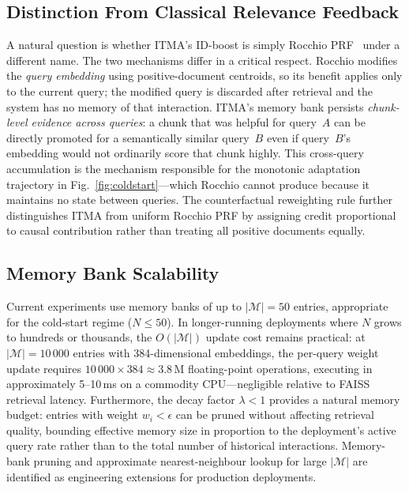 \documentclass[journal]{IEEEtran}
\begin{document}
\subsection{Distinction From Classical Relevance Feedback}
A natural question is whether ITMA's ID-boost is simply Rocchio
PRF~\cite{rocchio1971relevance} under a different name.  The two
mechanisms differ in a critical respect.  Rocchio modifies the
\emph{query embedding} using positive-document centroids, so its
benefit applies only to the current query; the modified query is
discarded after retrieval and the system has no memory of that
interaction.  ITMA's memory bank persists \emph{chunk-level evidence
across queries}: a chunk that was helpful for query~$A$ can be
directly promoted for a semantically similar query~$B$ even if
query~$B$'s embedding would not ordinarily score that chunk highly.
This cross-query accumulation is the mechanism responsible for the
monotonic adaptation trajectory in Fig.~\ref{fig:coldstart}---which
Rocchio cannot produce because it maintains no state between queries.
The counterfactual reweighting rule further distinguishes ITMA from
uniform Rocchio PRF by assigning credit proportional to causal
contribution rather than treating all positive documents equally.

\subsection{Memory Bank Scalability}
Current experiments use memory banks of up to $|\mathcal{M}|{=}50$
entries, appropriate for the cold-start regime ($N\leq 50$).  In
longer-running deployments where $N$ grows to hundreds or thousands,
the $O(|\mathcal{M}|)$ update cost remains practical: at
$|\mathcal{M}|{=}10\,000$ entries with 384-dimensional embeddings, the
per-query weight update requires $10\,000 \times 384 \approx 3.8$\,M
floating-point operations, executing in approximately 5--10\,ms on a
commodity CPU---negligible relative to FAISS retrieval latency.
Furthermore, the decay factor $\lambda<1$ provides a natural memory
budget: entries with weight $w_i < \epsilon$ can be pruned without
affecting retrieval quality, bounding effective memory size in
proportion to the deployment's active query rate rather than to the
total number of historical interactions.  Memory-bank pruning and
approximate nearest-neighbour lookup for large $|\mathcal{M}|$ are
identified as engineering extensions for production deployments.
\end{document}
